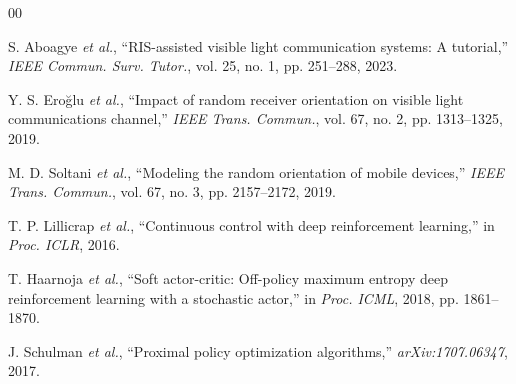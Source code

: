 \documentclass[conference]{IEEEtran}
\begin{document}

\begin{thebibliography}{00}

S. Aboagye \emph{et al.}, ``RIS-assisted visible light communication systems:
A tutorial,'' \emph{IEEE Commun. Surv. Tutor.}, vol. 25, no. 1, pp. 251--288,
2023.

Y. S. Ero\u{g}lu \emph{et al.}, ``Impact of random receiver orientation on
visible light communications channel,'' \emph{IEEE Trans. Commun.}, vol. 67,
no. 2, pp. 1313--1325, 2019.

M. D. Soltani \emph{et al.}, ``Modeling the random orientation of mobile
devices,'' \emph{IEEE Trans. Commun.}, vol. 67, no. 3, pp. 2157--2172, 2019.

T. P. Lillicrap \emph{et al.}, ``Continuous control with deep reinforcement
learning,'' in \emph{Proc. ICLR}, 2016.

T. Haarnoja \emph{et al.}, ``Soft actor-critic: Off-policy maximum entropy
deep reinforcement learning with a stochastic actor,'' in \emph{Proc. ICML},
2018, pp. 1861--1870.

J. Schulman \emph{et al.}, ``Proximal policy optimization algorithms,''
\emph{arXiv:1707.06347}, 2017.

\end{thebibliography}
\end{document}
